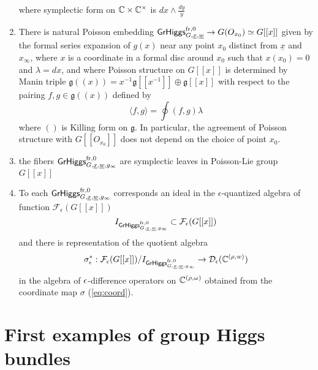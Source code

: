 \documentclass[12pt,psamsfonts,reqno]{amsart}
\begin{document}
\begin{proposition}
\begin{enumerate}
   where symplectic form on $\mathbb C \times \mathbb C^{\times}$ is $dx \wedge \frac{dy}{y}$ 
 \item There is natural Poisson embedding $\mathsf{GrHiggs}_{G,\underline{x}, \underline{w}}^{\mathrm{fr},0} \to
   G(O_{x_0})\simeq G[[x]]$ given by the formal series expansion of $g(x)$ near any point $x_0$
distinct from $\underline{x}$ and $x_\infty$,
where $x$ is a coordinate in a formal disc around $x_0$ such that $x(x_0) = 0$
and  $\lambda = d x$, and where Poisson structure on $G[[x]]$
   is determined by Manin triple $\mathfrak{g}((x)) =
   x^{-1} \mathfrak{g}[[x^{-1}]] \oplus \mathfrak{g}[[x]]$
   with respect to the pairing $f,g \in \mathfrak{g}((x))$ defined by
   \begin{equation} 
     \langle f ,g \rangle  = \oint  ( f,  g) \lambda
   \end{equation}
   where $()$ is Killing form on $\mathfrak{g}$. In particular,
   the agreement of Poisson structure with $G[[O_{x_0}]]$ does not depend on the choice of point $x_0$.
 \item the fibers $\mathsf{GrHiggs}_{G,\underline{x}, \underline{w}, g_\infty}^{\mathrm{fr},0}$ are symplectic leaves
   in Poisson-Lie group $G[[x]]$
 \item To each $\mathsf{GrHiggs}_{G,\underline{x}, \underline{w}, g_\infty}^{\mathrm{fr},0}$
   corresponds an ideal in the $\epsilon$-quantized algebra of function $\mathcal{F}_\epsilon(G[[x]])$
   \begin{equation}
     I_{\mathsf{GrHiggs}_{G,\underline{x}, \underline{w}, g_\infty}^{\mathrm{fr},0}} \subset \mathcal{F}_\epsilon(G[[x]])
   \end{equation}
   and there is representation  of the quotient algebra
   \begin{equation}
  \sigma_{\epsilon}^{*}:    \mathcal{F}_\epsilon(G[[x]])/     I_{\mathsf{GrHiggs}_{G,\underline{x}, \underline{w}, g_\infty}^{\mathrm{fr},0}} \to \mathcal{D}_{\epsilon}( \mathbb C^{(\rho, w)})
\end{equation}
in the algebra of $\epsilon$-difference operators on $\mathbb C^{(\rho,\omega)}$ obtained from the coordinate
map $\sigma$ (\ref{eq:coord}). 

 

  \end{enumerate}
\end{proposition}

  



\section{First examples of group Higgs bundles}
\end{document}
